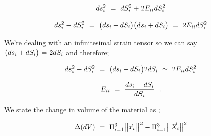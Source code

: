 \documentclass{article}
\begin{document}
\begin{equation} \label{eb-eq-1-85}
ds_{i}^{2} \hspace{0.125cm} = \hspace{0.125cm} dS_{i}^{2} + 2 E_{i i} dS_{i}^{2}
\end{equation} 

\begin{equation} \label{eb-eq-1-86}
ds_{i}^{2} - dS_{i}^{2} \hspace{0.125cm} = \hspace{0.125cm} \big( ds_i - dS_i \big) \big( ds_i + dS_i \big) \hspace{0.125cm} = \hspace{0.125cm} 2 E_{i i} dS_{i}^{2}
\end{equation} 

We're dealing with an infinitesimal strain tensor so we can say \begin{math} \big( ds_i + dS_i \big)  \hspace{0.025cm} = \hspace{0.025cm} 2 dS_i \end{math} and therefore;

\begin{equation} \label{eb-eq-1-87}
ds_{i}^{2} - dS_{i}^{2} \hspace{0.125cm} = \hspace{0.125cm} \big( ds_i - dS_i \big)  2 dS_i \hspace{0.125cm} \simeq \hspace{0.125cm} 2 E_{i i} dS_{i}^{2}
\end{equation} 

\begin{equation} \label{eb-eq-1-88}
E_{i i} \hspace{0.125cm} = \hspace{0.125cm} \frac{ds_i - dS_i}{dS_i} \hspace{0.225cm} .
\end{equation} 

We state the change in volume of the material as ;

\begin{equation} \label{eb-eq-1-89}
 \Delta ( dV ) \hspace{0.125cm} = \hspace{0.125cm} \Pi_{i \hspace{0.005cm} = \hspace{0.005cm} 1}^{3} \big| \big| \vec{x}_i \big| \big|^2 - \Pi_{i \hspace{0.005cm} = \hspace{0.005cm} 1}^{3} \big| \big| \vec{X}_i \big| \big|^2
\end{equation} 
\end{document}
